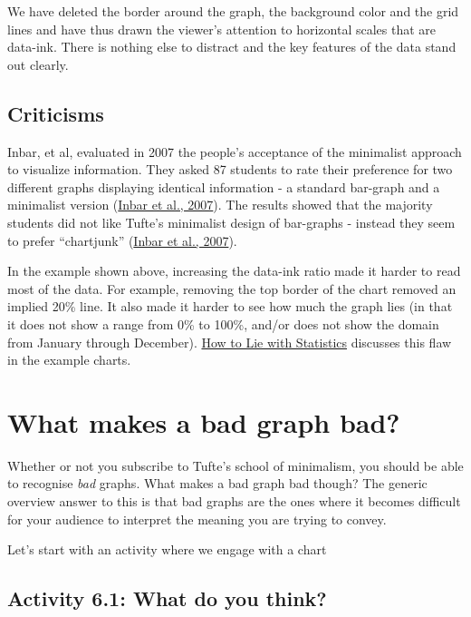 \documentclass[
]{book}
\begin{document}
We have deleted the border around the graph, the background color and the grid lines and have thus drawn the viewer's attention to horizontal scales that are data-ink. There is nothing else to distract and the key features of the data stand out clearly.

\hypertarget{criticisms}{%
\subsection{Criticisms}\label{criticisms}}

Inbar, et al, evaluated in 2007 the people's acceptance of the minimalist approach to visualize information. They asked 87 students to rate their preference for two different graphs displaying identical information - a standard bar-graph and a minimalist version (\href{http://portal.acm.org/citation.cfm?id=1362587}{Inbar et al., 2007}). The results showed that the majority students did not like Tufte's minimalist design of bar-graphs - instead they seem to prefer ``chartjunk'' (\href{http://portal.acm.org/citation.cfm?id=1362587}{Inbar et al., 2007}).

In the example shown above, increasing the data-ink ratio made it harder to read most of the data. For example, removing the top border of the chart removed an implied 20\% line. It also made it harder to see how much the graph lies (in that it does not show a range from 0\% to 100\%, and/or does not show the domain from January through December). \href{https://www.librarysearch.manchester.ac.uk/primo-explore/fulldisplay?docid=44MAN_ALMA_DS21134626320001631\&context=L\&vid=MU_NUI\&search_scope=BLENDED\&isFrbr=true\&tab=local\&lang=en_US}{How to Lie with Statistics} discusses this flaw in the example charts.

\hypertarget{what-makes-a-bad-graph-bad}{%
\section{What makes a bad graph bad?}\label{what-makes-a-bad-graph-bad}}

Whether or not you subscribe to Tufte's school of minimalism, you should be able to recognise \emph{bad} graphs. What makes a bad graph bad though? The generic overview answer to this is that bad graphs are the ones where it becomes difficult for your audience to interpret the meaning you are trying to convey.

Let's start with an activity where we engage with a chart

\hypertarget{activity-6.1-what-do-you-think}{%
\subsection{Activity 6.1: What do you think?}\label{activity-6.1-what-do-you-think}}
\end{document}
